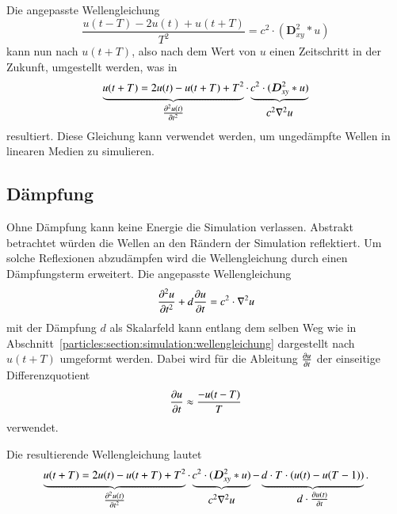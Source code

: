 Die angepasste Wellengleichung 
\[
    \frac{u(t-T) - 2 u(t) + u(t+T)}{T^2} = c^2 \cdot (\boldsymbol{D}^2_{xy} * u)
\]
kann nun nach $u(t+T)$, also nach dem Wert von $u$ einen Zeitschritt in der Zukunft, umgestellt werden, was in
\[
    \underbrace{%
        u(t+T) = 2 u(t) - u(t+T) + T^2      %
        \vphantom{\boldsymbol{D}^2_{xy}}        %
    }_{%
        \textstyle
        \frac{\d^2 u(t)}{\d t^2}            %
    } 
    \cdot 
    \underbrace{%
        c^2 \cdot (\boldsymbol{D}^2_{xy} * u)   %
    }_{%
        \textstyle
        c^2 \nabla^2 u                      %
        \vphantom{\frac{\d^2 u(t)}{\d t^2}} %
    }
\]
resultiert.
Diese Gleichung kann verwendet werden, um ungedämpfte Wellen in linearen Medien zu simulieren.

\subsection{Dämpfung}
Ohne Dämpfung kann keine Energie die Simulation verlassen. 
Abstrakt betrachtet würden die Wellen an den Rändern der Simulation reflektiert. 
Um solche Reflexionen abzudämpfen wird die Wellengleichung durch einen Dämpfungsterm erweitert.
Die angepasste Wellengleichung 
\[
    \frac{\d^2 u}{\d t^2} + d \frac{\d u}{\d t}= c^2 \cdot \nabla^2 u
\]
mit der Dämpfung $d$ als Skalarfeld kann entlang dem selben Weg wie in Abschnitt~\ref{particles:section:simulation:wellengleichung} dargestellt nach $u(t+T)$ umgeformt werden.
Dabei wird für die Ableitung $\frac{\d u}{\d t}$ der einseitige Differenzquotient
\[
    \frac{\d u}{\d t} \approx \frac{ - u(t-T)}{T}
\]
verwendet.

Die resultierende Wellengleichung lautet
\[
    \underbrace{%
        u(t+T) = 2 u(t) - u(t+T) + T^2      %
        \vphantom{\boldsymbol{D}^2_{xy}}        %
    }_{%
        \textstyle
        \frac{\d^2 u(t)}{\d t^2}            %
    } 
    \cdot 
    \underbrace{%
        c^2 \cdot (\boldsymbol{D}^2_{xy} * u)   %
    }_{%
        \textstyle
        c^2 \nabla^2 u                      %
        \vphantom{\frac{\d^2 u(t)}{\d t^2}} %
    }
     - 
    \underbrace{%
        d \cdot T \cdot (u(t) - u(T-1))
        \vphantom{\boldsymbol{D}^2_{xy}}        %
    }_{%
        \textstyle
        d \cdot \frac{\d u(t)}{\d t}        %
    }.
\]

